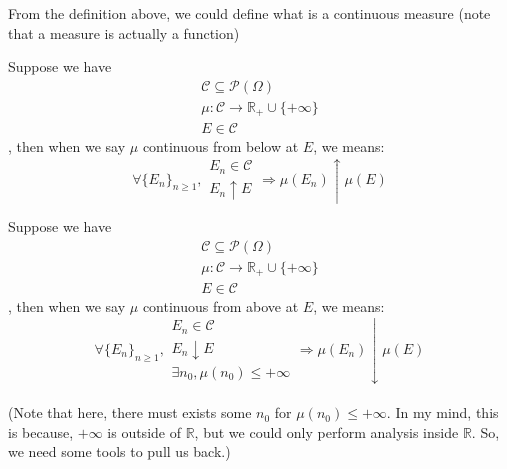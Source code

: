 From the definition above, we could define what is a continuous measure (note that a measure is actually a function)

\begin{define}
  Suppose we have
  \[\substack{
      \mathcal{C}\subseteq\mathcal{P}(\Omega) \\
      \mu:\mathcal{C} \to \mathbb{R}_+\cup\{+\infty\} \\
      E\in\mathcal{C}
  }\],
  then when we say $\mu$ continuous from below at $E$, we means:
  \[\forall \{E_n\}_{n\geq 1} , \substack{E_n\in\mathcal{C}\\E_n\uparrow E} \Rightarrow \mu(E_n)\uparrow\mu(E)\] 
\end{define}

\begin{define}
  Suppose we have
  \[\substack{
      \mathcal{C} \subseteq \mathcal{P}(\Omega) \\
      \mu : \mathcal{C} \to \mathbb{R}_+ \cup \{+\infty\} \\
      E \in \mathcal{C} 
    }\],
  then when we say $\mu$ continuous from above at $E$, we means:
  \[
    \forall \{E_n\}_{n\geq 1} , \substack{E_n \in\mathcal{C} \\ E_n\downarrow E \\ \exists n_0, \mu(n_0) \leq +\infty} \Rightarrow \mu(E_n)\downarrow\mu(E)
  \] \\
  (Note that here, there must exists some $n_0$ for $\mu(n_0)\leq +\infty$.
  In my mind, this is because, $+\infty$ is outside of $\mathbb{R}$, but we could only perform analysis inside $\mathbb{R}$.
  So, we need some tools to pull us back.)
\end{define}

